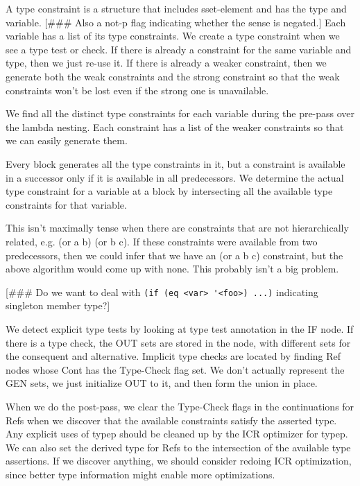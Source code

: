 A type constraint is a structure that includes sset-element and has the type
and variable.  
[\#\#\# Also a not-p flag indicating whether the sense is negated.]
  Each variable has a list of its type constraints.  We create a
type constraint when we see a type test or check.  If there is already a
constraint for the same variable and type, then we just re-use it.  If there is
already a weaker constraint, then we generate both the weak constraints and the
strong constraint so that the weak constraints won't be lost even if the strong
one is unavailable.

We find all the distinct type constraints for each variable during the pre-pass
over the lambda nesting.  Each constraint has a list of the weaker constraints
so that we can easily generate them.

Every block generates all the type constraints in it, but a constraint is
available in a successor only if it is available in all predecessors.  We
determine the actual type constraint for a variable at a block by intersecting
all the available type constraints for that variable.

This isn't maximally tense when there are constraints that are not
hierarchically related, e.g. (or a b) (or b c).  If these constraints were
available from two predecessors, then we could infer that we have an (or a b c)
constraint, but the above algorithm would come up with none.  This probably
isn't a big problem.

[\#\#\# Do we want to deal with \verb+(if (eq <var> '<foo>) ...)+ indicating singleton
member type?]

We detect explicit type tests by looking at type test annotation in the IF
node.  If there is a type check, the OUT sets are stored in the node, with
different sets for the consequent and alternative.  Implicit type checks are
located by finding Ref nodes whose Cont has the Type-Check flag set.  We don't
actually represent the GEN sets, we just initialize OUT to it, and then form
the union in place.

When we do the post-pass, we clear the Type-Check flags in the continuations
for Refs when we discover that the available constraints satisfy the asserted
type.  Any explicit uses of typep should be cleaned up by the ICR optimizer for
typep.  We can also set the derived type for Refs to the intersection of the
available type assertions.  If we discover anything, we should consider redoing
ICR optimization, since better type information might enable more
optimizations.



